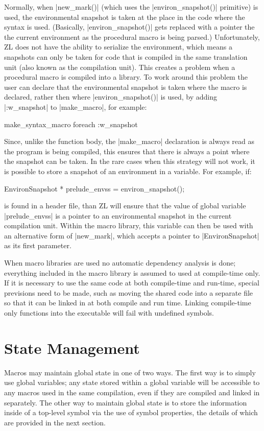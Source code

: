 Normally, when |new_mark()| (which uses the |environ_snapshot()|
primitive) is used, the environmental snapshot is taken at the place in
the code where the syntax is used.  (Basically, |environ_snapshot()|
gets replaced with a pointer the the current environment as the
procedural macro is being parsed.)  Unfortunately, ZL does not have
the ability to serialize the environment, which means a snapshots can
only be taken for code that is compiled in the same translation unit
(also known as the compilation unit).  This creates a problem when a
procedural macro is compiled into a library.  To work around this
problem the user can declare that the environmental snapshot is taken
where the macro is declared, rather then where |environ_snapshot()| is
used, by adding |:w_snapshot| to |make_macro|, for example:
\begin{code}
make_syntax_macro foreach :w_snapshot
\end{code}
Since, unlike the function body, the |make_macro| declaration is
always read as the program is being compiled, this ensures that there
is always a point where the snapshot can be taken.  In the rare cases
when this strategy will not work, it is possible to store a snapshot of
an environment in a variable.  For example, if:
\begin{code}
EnvironSnapshot * prelude_envss = environ_snapshot();
\end{code}
is found in a header file, than ZL will ensure that the value of
global variable |prelude_envss| is a pointer to an environmental
snapshot in the current compilation unit.  Within the macro library,
this variable can then be used with an alternative form of |new_mark|,
which accepts a pointer to |EnvironSnapshot| as its first parameter.

When macro libraries are used no automatic dependency analysis is
done; everything included in the macro library is assumed to used at
compile-time only.  If it is necessary to use the same code at both
compile-time and run-time, special previsions need to be made, such as
moving the shared code into a separate file so that it can be linked
in at both compile and run time.  Linking compile-time only
functions into the executable will fail with undefined symbols.

\section{State Management}

Macros may maintain global state in one of two ways.  The first way is
to simply use global variables; any state stored within a global
variable will be accessible to any macros used in the same
compilation, even if they are compiled and linked in separately.  The
other way to maintain global state is to store the information inside
of a top-level symbol via the use of symbol properties, the details of
which are provided in the next section.

